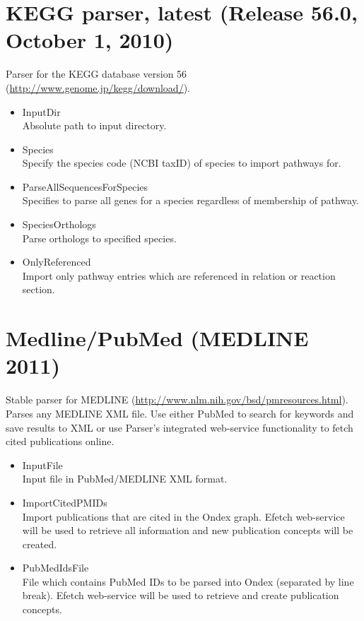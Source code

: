 \section{KEGG parser, latest (Release 56.0, October 1, 2010)}
Parser for the KEGG database version 56 (\url{http://www.genome.jp/kegg/download/}). 
\begin{itemize}
  \item{InputDir}\\
  Absolute path to input directory.
  \item{Species}\\
  Specify the species code (NCBI taxID) of species to import pathways for.
  \item{ParseAllSequencesForSpecies}\\
  Specifies to parse all genes for a species regardless of membership of pathway.
  \item{SpeciesOrthologs}\\
  Parse orthologs to specified species.
  \item{OnlyReferenced}\\
  Import only pathway entries which are referenced in relation or reaction section.
\end{itemize}

\section{Medline/PubMed (MEDLINE 2011)}
Stable parser for MEDLINE (\url{http://www.nlm.nih.gov/bsd/pmresources.html}).
Parses any MEDLINE XML file. Use either PubMed to search for keywords and save results to XML or 
use Parser's integrated web-service functionality to fetch cited publications online.
\begin{itemize}
  \item{InputFile}\\
  Input file in PubMed/MEDLINE XML format.
  \item{ImportCitedPMIDs}\\
  Import publications that are cited in the Ondex graph. 
  Efetch web-service will be used to retrieve all information and new publication concepts will be created.
  \item{PubMedIdsFile}\\
  File which contains PubMed IDs to be parsed into Ondex (separated by line break). 
  Efetch web-service will be used to retrieve and create publication concepts.
\end{itemize}

